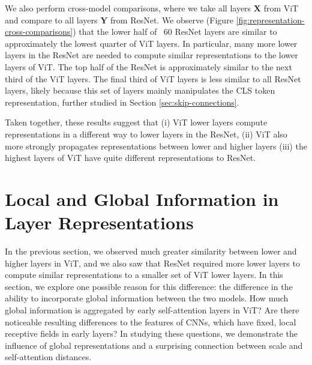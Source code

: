 \documentclass{article}
\begin{document}
\setcounter{figure}{2}

We also perform cross-model comparisons, where we take all layers $\bm{X}$ from ViT and compare to all layers $\bm{Y}$ from ResNet. We observe (Figure \ref{fig:representation-cross-comparisons}) that the lower half of ~60 ResNet layers are similar to approximately the lowest quarter of ViT layers. In particular, many more lower layers in the ResNet are needed to compute similar representations to the lower layers of ViT. The top half of the ResNet is approximately similar to the next third of the ViT layers. The final third of ViT layers is less similar to all ResNet layers, likely because this set of layers mainly manipulates the CLS token representation, further studied in Section \ref{sec:skip-connections}.

Taken together, these results suggest that (i) ViT lower layers compute representations in a different way to lower layers in the ResNet, (ii) ViT also more strongly propagates representations between lower and higher layers (iii) the highest layers of ViT have quite different representations to ResNet.  

\section{Local and Global Information in Layer Representations}
\label{sec:local-global}
In the previous section, we observed much greater similarity between lower and higher layers in ViT, and we also saw that ResNet required more lower layers to compute similar representations to a smaller set of ViT lower layers. In this section, we explore one possible reason for this difference: the difference in the ability to incorporate global information between the two models. How much global information is aggregated by early self-attention layers in ViT? Are there noticeable resulting differences to the features of CNNs, which have fixed, local receptive fields in early layers? In studying these questions, we demonstrate the influence of global representations and a surprising connection between scale and self-attention distances.
\end{document}
